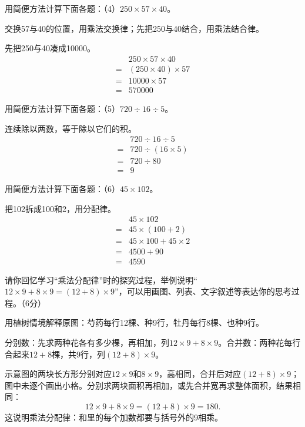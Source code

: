用简便方法计算下面各题：（4）\(250\times57\times40\)。\par
\begin{BookAnswer}
交换57与40的位置，用乘法交换律；先把250与40结合，用乘法结合律。\par 先把250与40凑成10000。\[\begin{aligned} &250\times57\times40\\={}&(250\times40)\times57\\={}&10000\times57\\={}&570000\end{aligned}\]
\end{BookAnswer}

用简便方法计算下面各题：（5）\(720\div16\div5\)。\par
\begin{BookAnswer}
连续除以两数，等于除以它们的积。\[\begin{aligned} &720\div16\div5\\={}&720\div(16\times5)\\={}&720\div80\\={}&9\end{aligned}\]
\end{BookAnswer}

用简便方法计算下面各题：（6）\(45\times102\)。\par
\begin{BookAnswer}
把102拆成100和2，用分配律。\[\begin{aligned} &45\times102\\={}&45\times(100+2)\\={}&45\times100+45\times2\\={}&4500+90\\={}&4590\end{aligned}\]
\end{BookAnswer}

请你回忆学习“乘法分配律”时的探究过程，举例说明“\(12\times9+8\times9=(12+8)\times9\)”，可以用画图、列表、文字叙述等表达你的思考过程。（6分）\par
\begin{BookAnswer}
用植树情境解释原图：芍药每行12棵、种9行，牡丹每行8棵、也种9行。\par 分别数：先求两种花各有多少棵，再相加，列\(12\times9+8\times9\)。合并数：两种花每行合起来\(12+8\)棵，共9行，列\((12+8)\times9\)。\par 示意图的两块长方形分别对应\(12\times9\)和\(8\times9\)，高相同，合并后对应\((12+8)\times9\)；图中未逐个画出小格。分别求两块面积再相加，或先合并宽再求整体面积，结果相同：\[12\times9+8\times9=(12+8)\times9=180.\]这说明乘法分配律：和里的每个加数都要与括号外的9相乘。
\end{BookAnswer}

